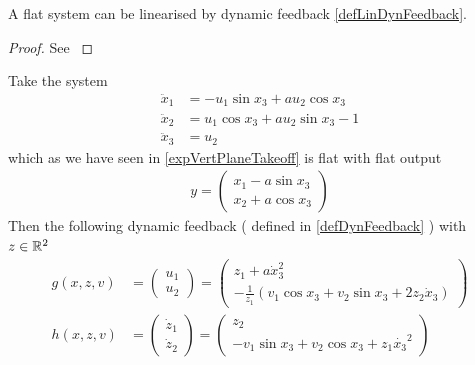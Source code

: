 \documentclass[12pt]{article}
\begin{document}
\begin{theorem} \label{flatImpLinDynFeedback}
  A flat system can be linearised by dynamic feedback \ref{defLinDynFeedback}.
\end{theorem}
\begin{proof}
  See \cite[page 50, corollary 3.15]{MR99}
\end{proof}

\begin{example} \label{expVertPlaneTakeoffLin}
  Take the system
  \begin{equation}\begin{aligned} \label{eq5}
    \ddot{x}_1 &= -u_1 \sin{x_3} + a u_2 \cos{x_3} \\
    \ddot{x}_2 &= u_1 \cos{x_3} + a u_2 \sin{x_3} - 1 \\
    \ddot{x}_3 &= u_2
  \end{aligned}\end{equation}
  which as we have seen in \ref{expVertPlaneTakeoff} is flat with flat output
  \begin{align}
    y =
    \begin{pmatrix}
      x_1 - a \sin{x_3} \\
      x_2 + a \cos{x_3}
    \end{pmatrix}
  \end{align}
  Then the following dynamic feedback ( defined in \ref{defDynFeedback} ) with $z \in \mathbb{R}^2$
  \begin{equation}\begin{aligned}
  	g(x,z,v)
    &= \begin{pmatrix} u_1 \\ u_2 \end{pmatrix}
    = \begin{pmatrix} z_1 + a \dot{x}_3^2 \\ -\frac{1}{z_1}(v_1 \cos{x_3} + v_2 \sin{x_3} + 2 z_2 \dot{x}_3) \end{pmatrix}
    \\
    h(x,z,v)
    &= \begin{pmatrix}\dot{z}_1 \\ \dot{z}_2 \end{pmatrix}
    = \begin{pmatrix}z_2 \\ -v_1 \sin{x_3} + v_2 \cos{x_3} + z_1\dot{x_3}^2 \end{pmatrix}
  \end{aligned}\end{equation}

\end{example}
\end{document}
